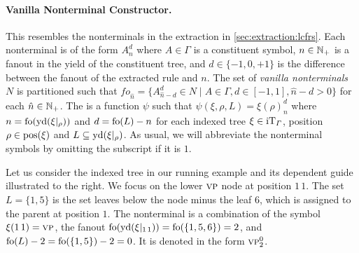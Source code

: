 \documentclass[../../document.tex]{subfiles}
\begin{document}
    \paragraph{Vanilla Nonterminal Constructor.}
    This resembles the nonterminals in the extraction in \cref{sec:extraction:lcfrs}.
    Each nonterminal is of the form \(A_{n}^{d}\) where \(A \in \varGamma\) is a constituent symbol, \(n \in \mathbb{N}_+\) is a fanout in the yield of the constituent tree, and \(d \in \{-1,0,+1\}\) is the difference between the fanout of the extracted rule and \(n\).
    The set of \emph{vanilla nonterminals} \(N\) is partitioned such that \(\mathit{fo}_{\hat{n}} = \{ A^d_{\hat{n}-d} \in N \mid A \in \varGamma, d \in [-1,1], \hat{n}-d > 0 \}\) for each \(\hat{n} \in \mathbb{N}_+\).
    The  is a function \(\psi\) such that \(\psi(\xi, \rho, L) = \xi(\rho)_{n}^{d}\) where \(n = \operatorname{fo}(\operatorname{yd}(\xi|_\rho))\) and \(d = \operatorname{fo}(L) - n\) for each indexed tree \(\xi \in \operatorname{iT}_\varGamma\), position \(\rho \in \operatorname{pos}(\xi)\) and \(L \subseteq \operatorname{yd}(\xi|_\rho)\).
    As usual, we will abbreviate the nonterminal symbols by omitting the subscript if it is \(1\).

    \begin{wrapfigure}[6]{r}{0pt}
        
    \end{wrapfigure}
    Let us consider the indexed tree in our running example and its dependent guide illustrated to the right.
    We focus on the lower \(\textsc{vp}\) node at position \(1\,1\).
    The set \(L= \{1,5\}\) is the set leaves below the node minus the leaf \(6\), which is assigned to the parent at position \(1\).
    The nonterminal is a combination of the symbol \(\xi(1\,1) = \textsc{vp}\), the fanout \(\operatorname{fo}(\operatorname{yd}(\xi|_{1\,1})) = \operatorname{fo}(\{1,5,6\}) = 2\), and \(\operatorname{fo}(L) - 2 = \operatorname{fo}(\{1,5\})-2=0\).
    It is denoted in the form \(\textsc{vp}^0_2\).
    \exampleqed
\end{document}
